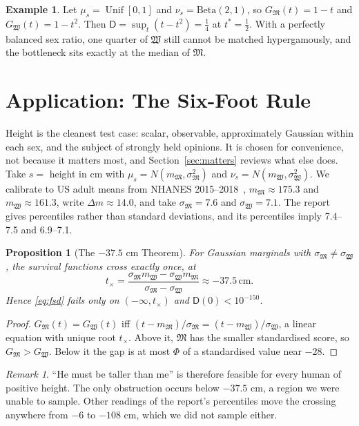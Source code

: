 \documentclass[11pt]{article}
\let\oldsection\section
\renewcommand{\section}{\Needspace{0.25\textheight}\oldsection}
\newtheorem{proposition}[theorem]{Proposition}
\theoremstyle{definition}
\newtheorem{example}[theorem]{Example}
\theoremstyle{remark}
\newtheorem{remark}[theorem]{Remark}
\newcommand{\M}{\mathfrak{M}}
\newcommand{\W}{\mathfrak{W}}
\newcommand{\D}{\mathsf{D}}
\DeclareMathOperator{\Unif}{Unif}
\begin{document}
\begin{example}\label{ex:beta}
  Let $\mu_s = \Unif[0,1]$ and $\nu_s = \mathrm{Beta}(2,1)$, so
  $G_\M(t) = 1-t$ and $G_\W(t) = 1-t^2$. Then $\D = \sup_t(t-t^2) =
  \frac14$ at $t^* = \frac12$. With a perfectly balanced sex ratio,
  one quarter of $\W$ still cannot be matched hypergamously, and the
  bottleneck sits exactly at the median of $\M$.
\end{example}

\section{Application: The Six-Foot Rule}\label{sec:sixfoot}

Height is the cleanest test case: scalar, observable, approximately
Gaussian within each sex, and the subject of strongly held opinions. It
is chosen for convenience, not because it matters most, and
Section~\ref{sec:matters} reviews what else does.
Take $s ={}$ height in cm with $\mu_s = N(m_\M,\sigma_\M^2)$ and
$\nu_s = N(m_\W,\sigma_\W^2)$. We calibrate to US adult means from
NHANES 2015--2018~\cite{fryar}, $m_\M\approx175.3$ and
$m_\W\approx161.3$, write $\Delta m\approx14.0$, and take
$\sigma_\M = 7.6$ and $\sigma_\W = 7.1$. The report gives percentiles
rather than standard deviations, and its percentiles imply 7.4--7.5
and 6.9--7.1.

\begin{proposition}[The $-37.5$ cm Theorem]\label{prop:crossing}
  For Gaussian marginals with $\sigma_\M\ne\sigma_\W$, the survival
  functions cross exactly once, at
  \begin{equation}
    t_\times = \frac{\sigma_\M m_\W - \sigma_\W m_\M}{\sigma_\M -
    \sigma_\W} \approx -37.5\,\mathrm{cm}.
  \end{equation}
  Hence \eqref{eq:fsd} fails only on $(-\infty,t_\times)$ and $\D(0)
  < 10^{-150}$.
\end{proposition}

\begin{proof}
  $G_\M(t) = G_\W(t)$ iff $(t-m_\M)/\sigma_\M = (t-m_\W)/\sigma_\W$,
  a linear equation with unique root $t_\times$. Above it, $\M$ has
  the smaller standardised score, so $G_\M > G_\W$. Below it the gap
  is at most $\Phi$ of a standardised value near $-28$.
\end{proof}

\begin{remark}
  ``He must be taller than me'' is therefore feasible for every human
  of positive height. The only obstruction occurs below $-37.5$ cm, a
  region we were unable to sample. Other readings of the
  report's percentiles move the crossing anywhere from $-6$ to $-108$
  cm, which we did not sample either.
\end{remark}
\end{document}
